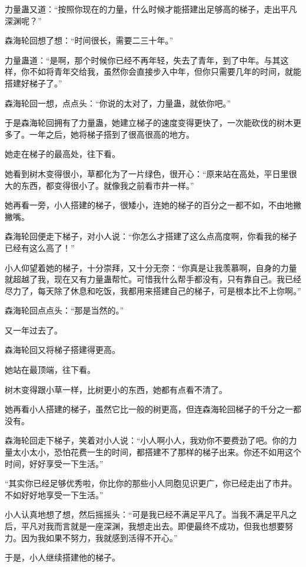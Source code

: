 \begin{this_body}
力量蛊又道：“按照你现在的力量，什么时候才能搭建出足够高的梯子，走出平凡深渊呢？”

森海轮回想了想：“时间很长，需要二三十年。”

力量蛊道：“是啊，那个时候你已经不再年轻，失去了青年，到了中年。与其这样，你不如将青年交给我，虽然你会直接步入中年，但你只需要几年的时间，就能搭建好梯子了。”

森海轮回一想，点点头：“你说的太对了，力量蛊，就依你吧。”

于是森海轮回拥有了力量蛊，她建立梯子的速度变得更快了，一次能砍伐的树木更多了。一年之后，她将梯子搭到了很高很高的地方。

她走在梯子的最高处，往下看。

她看到树木变得很小，草都化为了一片绿色，很开心：“原来站在高处，平日里很大的东西，都变得很小了。就像我之前看市井一样。”

她再看一旁，小人搭建的梯子，很矮小，连她的梯子的百分之一都不如，不由地撇撇嘴。

森海轮回便走下梯子，对小人说：“你怎么才搭建了这么点高度啊，你看我的梯子已经有这么高了！”

小人仰望着她的梯子，十分崇拜，又十分无奈：“你真是让我羡慕啊，自身的力量就超越了我，现在又有力量蛊帮忙。可惜我什么帮手都没有，只有靠自己。我已经尽力了，每天除了休息和吃饭，我都用来搭建自己的梯子，可是根本比不上你啊。”

森海轮回点点头：“那是当然的。”

又一年过去了。

森海轮回又将梯子搭建得更高。

她站在最顶端，往下看。

树木变得跟小草一样，比树更小的东西，她都有点看不清了。

她再看小人搭建的梯子，虽然它比一般的树更高，但连森海轮回梯子的千分之一都没有。

森海轮回走下梯子，笑着对小人说：“小人啊小人，我劝你不要费劲了吧。你的力量太小太小，恐怕花费一生的时间，都搭建不了那样的梯子出来。你还不如用这个时间，好好享受一下生活。”

“其实你已经足够优秀啦，你比你的那些小人同胞见识更广，你已经走出了市井。不如好好地享受一下生活。”

小人认真地想了想，然后摇摇头：“可是我已经不满足平凡了。当我不满足平凡之后，平凡对我而言就是一座深渊，我想走出去。即便最终不成功，但我也想要努力。因为我如果不努力，我就感到活得不开心。”

于是，小人继续搭建他的梯子。


\end{this_body}
